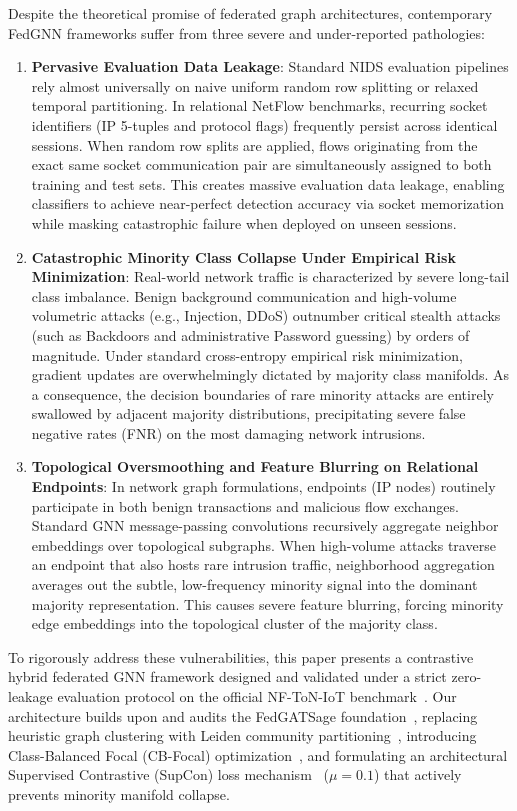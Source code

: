 \documentclass[journal,onecolumn]{IEEEtran}
\begin{document}
Despite the theoretical promise of federated graph architectures, contemporary FedGNN frameworks suffer from three severe and under-reported pathologies:
\begin{enumerate}
    \item \textbf{Pervasive Evaluation Data Leakage}: Standard NIDS evaluation pipelines rely almost universally on naive uniform random row splitting or relaxed temporal partitioning. In relational NetFlow benchmarks, recurring socket identifiers (IP 5-tuples and protocol flags) frequently persist across identical sessions. When random row splits are applied, flows originating from the exact same socket communication pair are simultaneously assigned to both training and test sets. This creates massive evaluation data leakage, enabling classifiers to achieve near-perfect detection accuracy via socket memorization while masking catastrophic failure when deployed on unseen sessions.
    \item \textbf{Catastrophic Minority Class Collapse Under Empirical Risk Minimization}: Real-world network traffic is characterized by severe long-tail class imbalance. Benign background communication and high-volume volumetric attacks (e.g., Injection, DDoS) outnumber critical stealth attacks (such as Backdoors and administrative Password guessing) by orders of magnitude. Under standard cross-entropy empirical risk minimization, gradient updates are overwhelmingly dictated by majority class manifolds. As a consequence, the decision boundaries of rare minority attacks are entirely swallowed by adjacent majority distributions, precipitating severe false negative rates (FNR) on the most damaging network intrusions.
    \item \textbf{Topological Oversmoothing and Feature Blurring on Relational Endpoints}: In network graph formulations, endpoints (IP nodes) routinely participate in both benign transactions and malicious flow exchanges. Standard GNN message-passing convolutions recursively aggregate neighbor embeddings over topological subgraphs. When high-volume attacks traverse an endpoint that also hosts rare intrusion traffic, neighborhood aggregation averages out the subtle, low-frequency minority signal into the dominant majority representation. This causes severe feature blurring, forcing minority edge embeddings into the topological cluster of the majority class.
\end{enumerate}

To rigorously address these vulnerabilities, this paper presents a contrastive hybrid federated GNN framework designed and validated under a strict zero-leakage evaluation protocol on the official NF-ToN-IoT benchmark~\cite{alsaedi2020toniot}. Our architecture builds upon and audits the FedGATSage foundation~\cite{altfaily2025fedgatsage}, replacing heuristic graph clustering with Leiden community partitioning~\cite{traag2019leiden}, introducing Class-Balanced Focal (CB-Focal) optimization~\cite{cui2019cbloss, lin2017focal}, and formulating an architectural Supervised Contrastive (SupCon) loss mechanism~\cite{khosla2020supcon} ($\mu = 0.1$) that actively prevents minority manifold collapse.
\end{document}
